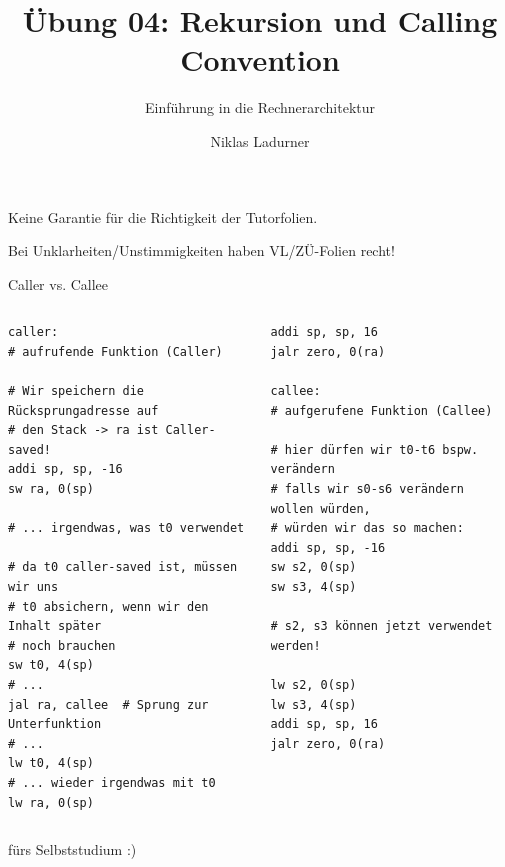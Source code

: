 \documentclass[
  german,            %
  aspectratio=169,    %
]{tumbeamer}
\title{Übung 04: Rekursion und Calling Convention}
\subtitle{Einführung in die Rechnerarchitektur}
\author{Niklas Ladurner}
\institute{\theChairName\\\theDepartmentName\\\theUniversityName}
\date{\DTMdisplaydate{2024}{11}{8}{-1}}
\begin{document}
\maketitle

\begin{frame}[c, fragile]{}{}
  \begin{center}
    \LARGE  Keine Garantie für die Richtigkeit der Tutorfolien.

    \Large Bei Unklarheiten/Unstimmigkeiten haben VL/ZÜ-Folien recht!
  \end{center}
\end{frame}

\begin{frame}[c, fragile]{Caller vs. Callee}{}
  \begin{columns}[c]
    \begin{column}{0.5\textwidth}
      \begin{verbatim}
caller:
# aufrufende Funktion (Caller)

# Wir speichern die Rücksprungadresse auf 
# den Stack -> ra ist Caller-saved!
addi sp, sp, -16
sw ra, 0(sp)

# ... irgendwas, was t0 verwendet

# da t0 caller-saved ist, müssen wir uns
# t0 absichern, wenn wir den Inhalt später
# noch brauchen
sw t0, 4(sp)
# ...
jal ra, callee  # Sprung zur Unterfunktion
# ...
lw t0, 4(sp)
# ... wieder irgendwas mit t0
lw ra, 0(sp)
        \end{verbatim}
    \end{column}
    \begin{column}{0.5\textwidth}
      \begin{verbatim}
addi sp, sp, 16
jalr zero, 0(ra)

callee:
# aufgerufene Funktion (Callee)

# hier dürfen wir t0-t6 bspw. verändern
# falls wir s0-s6 verändern wollen würden,
# würden wir das so machen:
addi sp, sp, -16
sw s2, 0(sp)
sw s3, 4(sp)

# s2, s3 können jetzt verwendet werden!

lw s2, 0(sp)
lw s3, 4(sp)
addi sp, sp, 16
jalr zero, 0(ra)
      \end{verbatim}
    \end{column}
  \end{columns}
  \begin{center}
    \small{fürs Selbststudium :)}
  \end{center}
\end{frame}
\end{document}
